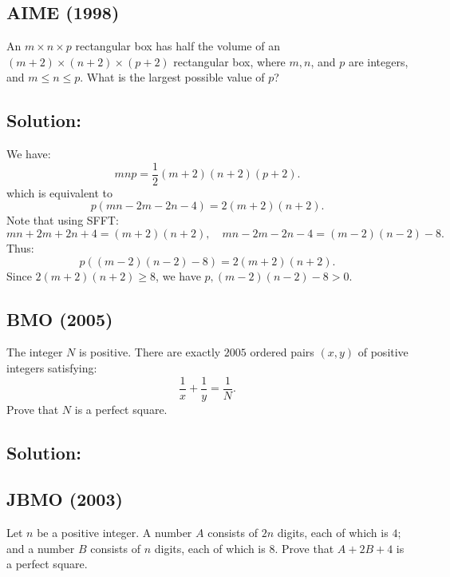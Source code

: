 \begin{solution}
    \subsection{AIME (1998)} An \( m \times n \times p \) rectangular box has half the volume of an \( \left(m+2\right) \times \left(n+2\right) \times \left(p+2\right) \) rectangular box, where \( m, n \), and \( p \) are integers, and \( m \leq n \leq p \). What is the largest possible value of \( p \)? \subsection*{Solution:} We have:
    \[
        mnp = \frac{1}{2}\left( m + 2 \right)\left( n + 2 \right)\left( p + 2 \right).
    \]
    which is equivalent to
    \[
        p\left( mn - 2m - 2n - 4 \right) = 2\left( m+2 \right)\left( n+2 \right).
    \]
    Note that using SFFT:
    \[
        mn + 2m + 2n + 4 = \left( m + 2 \right)\left( n + 2 \right), \quad mn - 2m - 2n - 4 = \left( m - 2 \right)\left( n - 2 \right) - 8.
    \]
    Thus:
    \[
        p\left(\left( m - 2 \right)\left( n - 2 \right) - 8\right)= 2\left( m + 2 \right)\left( n + 2 \right).
    \]
    Since \( 2\left( m + 2 \right)\left( n + 2 \right) \geq 8 \), we have \( p,\left( m - 2 \right)\left( n - 2 \right) - 8 >0 \).

    \subsection{BMO (2005)} The integer \( N \) is positive. There are exactly \( 2005 \) ordered pairs \( \left(x,y\right) \) of positive integers satisfying:
    \[
        \frac{1}{x} + \frac{1}{y} = \frac{1}{N}.
    \]
    Prove that \( N \) is a perfect square. \subsection*{Solution:}

    \subsection{JBMO (2003)} Let \( n \) be a positive integer. A number \( A \) consists of \( 2n \) digits, each of which is \( 4 \); and a number \( B \) consists of \( n \) digits, each of which is \( 8 \). Prove that \( A + 2B + 4 \) is a perfect square.


\end{solution}
